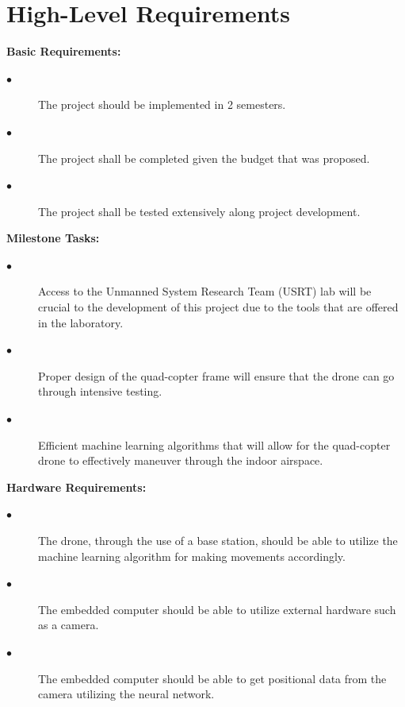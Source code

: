 \documentclass[12pt,onecolumn]{IEEEtran}			%
\begin{document}
 
 \section{High-Level Requirements}

 
\textbf{Basic Requirements:}

 \begin{description}
  \item[$\bullet$ ] The project should be implemented in 2 semesters. 
  \item[$\bullet$ ] The project shall be completed given the budget that was proposed. 
  \item[$\bullet$ ] The project shall be tested extensively along project development. 
  
\end{description} 

\vspace{12pt} 

 \textbf{Milestone Tasks:}
 
 \begin{description}
  \item[$\bullet$ ] Access to the Unmanned System Research Team (USRT) lab will be crucial to the development of this project due to the tools that are offered in the laboratory. 
  \item[$\bullet$ ] Proper design of the quad-copter frame will ensure that the drone can go through intensive testing.  
  \item[$\bullet$ ] Efficient machine learning algorithms that will allow for the quad-copter drone to effectively maneuver through the indoor airspace. 
\end{description} 

\vspace{12pt} 

\textbf{Hardware Requirements:}
 
 \begin{description}
  \item[$\bullet$ ] The drone, through the use of a base station, should be able to utilize the machine learning algorithm for making movements accordingly. 
  \item[$\bullet$ ] The embedded computer should be able to utilize external hardware such as a camera. 
  \item[$\bullet$ ] The embedded computer should be able to get positional data from the camera utilizing the neural network. 
\end{description} 
\end{document}
